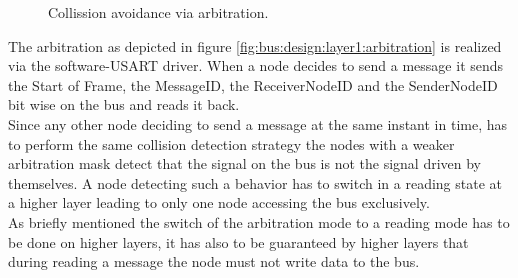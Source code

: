 \begin{figure}[h]
\begin{center}
\end{center}
\caption{Collission avoidance via arbitration.}
\end{figure}

The arbitration as depicted in figure \ref{fig:bus:design:layer1:arbitration} 
is realized via the software-USART driver. 
When a node decides to send a message it sends the Start of Frame, the MessageID, 
the ReceiverNodeID and the SenderNodeID bit wise on the bus and reads it back.\\

Since any other node deciding to send a message at the same instant in time, 
has to perform the same collision detection strategy the nodes with a weaker 
arbitration mask detect that the signal on the bus is not the signal driven by themselves.
A node detecting such a behavior has to switch in a reading state 
at a higher layer leading to only one node accessing the bus exclusively.\\

As briefly mentioned the switch of the arbitration mode to a reading 
mode has to be done on higher layers, it has also to be guaranteed 
by higher layers that during reading a message the node must not write data to the bus.
